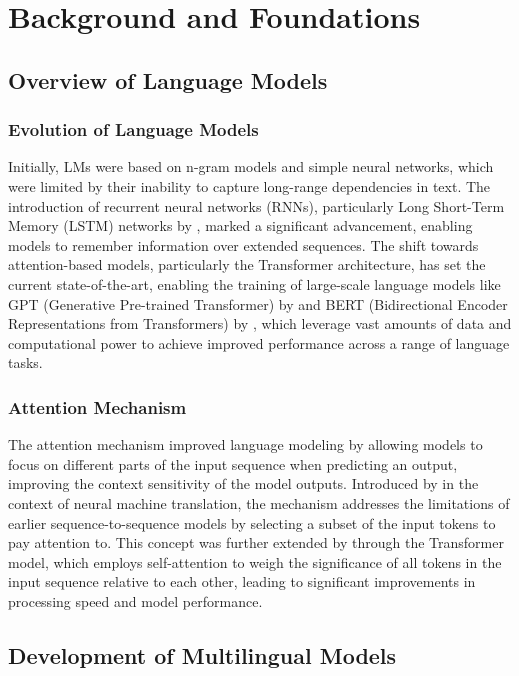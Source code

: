 \chapter{Background and Foundations}\label{chp:Background}
\section{Overview of Language Models}
\subsection{Evolution of Language Models}
Initially, LMs were based on n-gram models and simple neural networks, which were limited by their inability to capture long-range dependencies in text. The introduction of recurrent neural networks (RNNs), particularly Long Short-Term Memory (LSTM) networks by \citet{hochreiter1997long}, marked a significant advancement, enabling models to remember information over extended sequences. The shift towards attention-based models, particularly the Transformer architecture, has set the current state-of-the-art, enabling the training of large-scale language models like GPT (Generative Pre-trained Transformer) by \citet{radford2018improving} and BERT (Bidirectional Encoder Representations from Transformers) by \citet{devlin2018bert}, which leverage vast amounts of data and computational power to achieve improved performance across a range of language tasks.

\subsection{Attention Mechanism}
The attention mechanism improved language modeling by allowing models to focus on different parts of the input sequence when predicting an output, improving the context sensitivity of the model outputs. Introduced by \citet{bahdanau2014neural} in the context of neural machine translation, the mechanism addresses the limitations of earlier sequence-to-sequence models by selecting a subset of the input tokens to pay attention to. This concept was further extended by \citet{vaswani2017attention} through the Transformer model, which employs self-attention to weigh the significance of all tokens in the input sequence relative to each other, leading to significant improvements in processing speed and model performance.

\section{Development of Multilingual Models}
